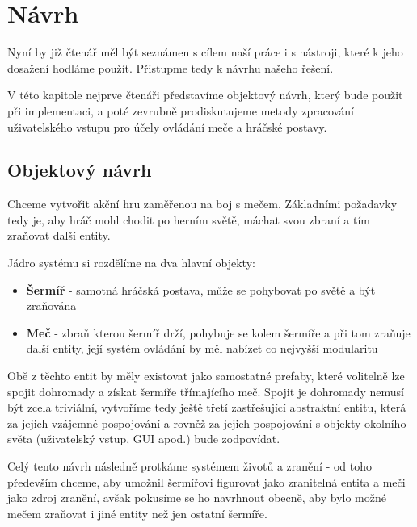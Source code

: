 \chapter{Návrh} \label{interfacesChapter}

Nyní by již čtenář měl být seznámen s cílem naší práce i s nástroji, které k jeho dosažení hodláme použít. Přistupme tedy k návrhu našeho řešení.

V této kapitole nejprve čtenáři představíme objektový návrh, který bude použit při implementaci, a poté zevrubně prodiskutujeme metody zpracování uživatelského vstupu pro účely ovládání meče a hráčské postavy.


\section{Objektový návrh}

Chceme vytvořit akční hru zaměřenou na boj s mečem. Základními požadavky tedy je, aby hráč mohl chodit po herním světě, máchat svou zbraní a tím zraňovat další entity. 

Jádro systému si rozdělíme na dva hlavní objekty:
\begin{itemize}
    \item \textbf{Šermíř} - samotná hráčská postava, může se pohybovat po světě a být zraňována
    \item \textbf{Meč} - zbraň kterou šermíř drží, pohybuje se kolem šermíře a při tom zraňuje další entity, její systém ovládání by měl nabízet co nejvyšší modularitu
\end{itemize}

Obě z těchto entit by měly existovat jako samostatné prefaby, které volitelně lze spojit dohromady a získat šermíře třímajícího meč. Spojit je dohromady nemusí být zcela triviální, vytvoříme tedy ještě třetí zastřešující abstraktní entitu, která za jejich vzájemné pospojování a rovněž za jejich pospojování s objekty okolního světa (uživatelský vstup, GUI apod.) bude zodpovídat.

Celý tento návrh následně protkáme systémem životů a zranění - od toho především chceme, aby umožnil šermířovi figurovat jako zranitelná entita a meči jako zdroj zranění, avšak pokusíme se ho navrhnout obecně, aby bylo možné mečem zraňovat i jiné entity než jen ostatní šermíře.

